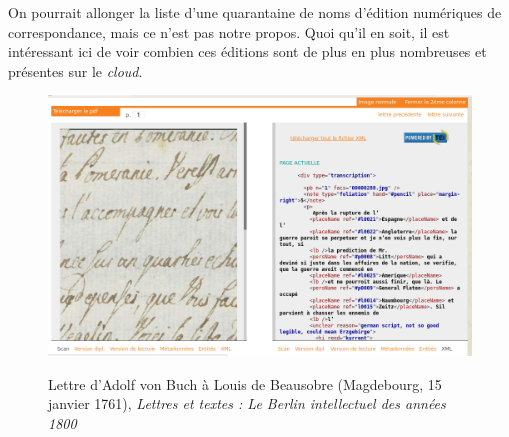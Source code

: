 On pourrait allonger la liste d'une quarantaine de noms d'édition numériques de correspondance, mais ce n'est pas notre propos. Quoi qu'il en soit, il est intéressant ici de voir combien ces éditions sont de plus en plus nombreuses et présentes sur le \emph{cloud}.

    \begin{figure}[ht]
    \centering
    \caption{Lettre d'Adolf von Buch à Louis de Beausobre (Magdebourg, 15 janvier 1761), \emph{Lettres et textes : Le Berlin intellectuel des années 1800}}
    \includegraphics[width=16cm]{images/berlin_lettre.png}
    \label{berlin_lettre}
\end{figure}

